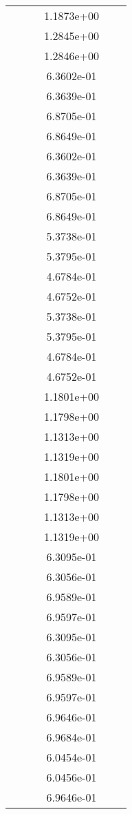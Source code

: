\begin{xltabular}{\textwidth}{r|rS[table-format=1.3e+2]S[table-format=1.4e+2]S[table-format=1.4e+2]S[table-format=-1.5]}
&  &  & 1.1873e+00 & & \\
&  &  & 1.2845e+00 & & \\
&  &  & 1.2846e+00 & & \\
&  &  & 6.3602e-01 & & \\
&  &  & 6.3639e-01 & & \\
&  &  & 6.8705e-01 & & \\
&  &  & 6.8649e-01 & & \\
&  &  & 6.3602e-01 & & \\
&  &  & 6.3639e-01 & & \\
&  &  & 6.8705e-01 & & \\
&  &  & 6.8649e-01 & & \\
&  &  & 5.3738e-01 & & \\
&  &  & 5.3795e-01 & & \\
&  &  & 4.6784e-01 & & \\
&  &  & 4.6752e-01 & & \\
&  &  & 5.3738e-01 & & \\
&  &  & 5.3795e-01 & & \\
&  &  & 4.6784e-01 & & \\
&  &  & 4.6752e-01 & & \\
&  &  & 1.1801e+00 & & \\
&  &  & 1.1798e+00 & & \\
&  &  & 1.1313e+00 & & \\
&  &  & 1.1319e+00 & & \\
&  &  & 1.1801e+00 & & \\
&  &  & 1.1798e+00 & & \\
&  &  & 1.1313e+00 & & \\
&  &  & 1.1319e+00 & & \\
&  &  & 6.3095e-01 & & \\
&  &  & 6.3056e-01 & & \\
&  &  & 6.9589e-01 & & \\
&  &  & 6.9597e-01 & & \\
&  &  & 6.3095e-01 & & \\
&  &  & 6.3056e-01 & & \\
&  &  & 6.9589e-01 & & \\
&  &  & 6.9597e-01 & & \\
&  &  & 6.9646e-01 & & \\
&  &  & 6.9684e-01 & & \\
&  &  & 6.0454e-01 & & \\
&  &  & 6.0456e-01 & & \\
&  &  & 6.9646e-01 & & \\

\end{xltabular}
